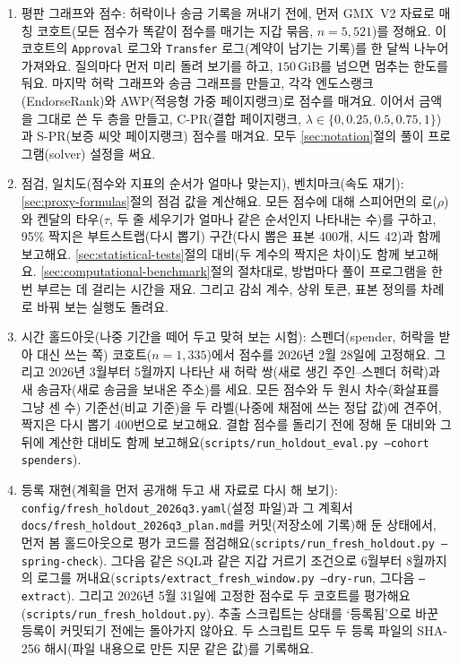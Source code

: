 \begin{enumerate}
\item 평판 그래프와 점수: 허락이나 송금 기록을 꺼내기 전에, 먼저 GMX~V2 자료로 매칭 코호트(모든 점수가 똑같이 점수를 매기는 지갑 묶음, $n=5{,}521$)를 정해요. 이 코호트의 \texttt{Approval} 로그와 \texttt{Transfer} 로그(계약이 남기는 기록)를 한 달씩 나누어 가져와요. 질의마다 먼저 미리 돌려 보기를 하고, $150$\,GiB를 넘으면 멈추는 한도를 둬요. 마지막 허락 그래프와 송금 그래프를 만들고, 각각 엔도스랭크(EndorseRank)와 AWP(적응형 가중 페이지랭크)로 점수를 매겨요. 이어서 금액을 그대로 쓴 두 층을 만들고, C-PR(결합 페이지랭크, $\lambda\in\{0,0.25,0.5,0.75,1\}$)과 S-PR(보증 씨앗 페이지랭크) 점수를 매겨요. 모두 \ref{sec:notation}절의 풀이 프로그램(solver) 설정을 써요.
\item 점검, 일치도(점수와 지표의 순서가 얼마나 맞는지), 벤치마크(속도 재기): \ref{sec:proxy-formulas}절의 점검 값을 계산해요. 모든 점수에 대해 스피어먼의 로($\rho$)와 켄달의 타우($\tau$, 두 줄 세우기가 얼마나 같은 순서인지 나타내는 수)를 구하고, 95\% 짝지은 부트스트랩(다시 뽑기) 구간(다시 뽑은 표본 400개, 시드 42)과 함께 보고해요. \ref{sec:statistical-tests}절의 대비(두 계수의 짝지은 차이)도 함께 보고해요. \ref{sec:computational-benchmark}절의 절차대로, 방법마다 풀이 프로그램을 한 번 부르는 데 걸리는 시간을 재요. 그리고 감쇠 계수, 상위 토큰, 표본 정의를 차례로 바꿔 보는 실행도 돌려요.
\item 시간 홀드아웃(나중 기간을 떼어 두고 맞혀 보는 시험): 스펜더(spender, 허락을 받아 대신 쓰는 쪽) 코호트($n=1{,}335$)에서 점수를 2026년 2월 28일에 고정해요. 그리고 2026년 3월부터 5월까지 나타난 새 허락 쌍(새로 생긴 주인–스펜더 허락)과 새 송금자(새로 송금을 보내온 주소)를 세요. 모든 점수와 두 원시 차수(화살표를 그냥 센 수) 기준선(비교 기준)을 두 라벨(나중에 채점에 쓰는 정답 값)에 견주어, 짝지은 다시 뽑기 400번으로 보고해요. 결합 점수를 돌리기 전에 정해 둔 대비와 그 뒤에 계산한 대비도 함께 보고해요(\texttt{scripts/run\_holdout\_eval.py --cohort spenders}).
\item 등록 재현(계획을 먼저 공개해 두고 새 자료로 다시 해 보기): \texttt{config/fresh\_holdout\_2026q3.yaml}(설정 파일)과 그 계획서 \texttt{docs/fresh\_holdout\_2026q3\_plan.md}를 커밋(저장소에 기록)해 둔 상태에서, 먼저 봄 홀드아웃으로 평가 코드를 점검해요(\texttt{scripts/run\_fresh\_holdout.py --spring-check}). 그다음 같은 SQL과 같은 지갑 거르기 조건으로 6월부터 8월까지의 로그를 꺼내요(\texttt{scripts/extract\_fresh\_window.py --dry-run}, 그다음 \texttt{--extract}). 그리고 2026년 5월 31일에 고정한 점수로 두 코호트를 평가해요(\texttt{scripts/run\_fresh\_holdout.py}). 추출 스크립트는 상태를 ‘등록됨’으로 바꾼 등록이 커밋되기 전에는 돌아가지 않아요. 두 스크립트 모두 두 등록 파일의 SHA-256 해시(파일 내용으로 만든 지문 같은 값)를 기록해요.
\end{enumerate}

